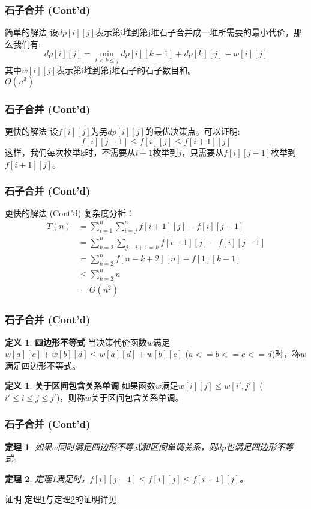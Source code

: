 \documentclass[hyperref={unicode=true}]{beamer}
\newtheorem{mytht}{\bf 定理}
\theoremstyle{definition}
\newtheorem{mydef}[]{\bf 定义}
\theoremstyle{proof}
\begin{document}
\begin{frame}\frametitle{石子合并 (Cont'd)}
  \begin{alertblock}{简单的解法}
    设$dp[i][j]$表示第i堆到第j堆石子合并成一堆所需要的最小代价，那么我们有:
    \[dp[i][j] = \min_{i < k \leq j}dp[i][k-1] + dp[k][j] + w[i][j]\]
    其中$w[i][j]$表示第i堆到第j堆石子的石子数目和。\\
    $O(n^3)$
  \end{alertblock}
\end{frame}
\begin{frame}\frametitle{石子合并 (Cont'd)}
  \begin{exampleblock}{更快的解法}
    设$f[i][j]$为另$dp[i][j]$的最优决策点。可以证明:
    \[f[i][j-1] \leq f[i][j] \leq f[i+1][j]\]
    这样，我们每次枚举k时，不需要从$i+1$枚举到$j$，只需要从$f[i][j-1]$枚举到$f[i+1][j]$。\\
  \end{exampleblock}
\end{frame}
\begin{frame}\frametitle{石子合并 (Cont'd)}
  \begin{exampleblock}{更快的解法 (Cont'd)}
    复杂度分析：
    \begin{align}
      T(n) &= \sum_{i=1}^{n}\sum_{i=j}^n f[i+1][j]-f[i][j-1]\\
      &= \sum_{k=2}^n\sum_{j-i+1=k} f[i+1][j] - f[i][j-1]\\
      &= \sum_{k=2}^n f[n-k+2][n]-f[1][k-1]\\
      &\leq \sum_{k=2}^n n\\
      &= O(n^2)
    \end{align}
  \end{exampleblock}
\end{frame}

\begin{frame}\frametitle{石子合并 (Cont'd)}
  \begin{mydef}{\bf 四边形不等式}
    当决策代价函数$w$满足$w[a][c]+w[b][d]\leq w[a][d]+w[b][c]$ ($a<=b<=c<=d$)时，称$w$满足四边形不等式。
  \end{mydef}
  \begin{mydef}{\bf 关于区间包含关系单调}
    如果函数$w$满足$w[i][j]\leq w[i',j']$ ($i' \leq i \leq j \leq j'$)，则称$w$关于区间包含关系单调。
  \end{mydef}
\end{frame}

\begin{frame}\frametitle{石子合并 (Cont'd)}
  \begin{mytht}{}\label{tht1}
    如果$w$同时满足四边形不等式和区间单调关系，则$dp$也满足四边形不等式。
  \end{mytht}
  \begin{mytht}{}\label{tht2}
    定理\ref{tht1}满足时，$f[i][j-1] \leq f[i][j] \leq f[i+1][j]$。
  \end{mytht}
  \begin{exampleblock}{证明}
    定理\ref{tht1}与定理\ref{tht2}的证明详见\cite{art3}
  \end{exampleblock}
\end{frame}
\end{document}
